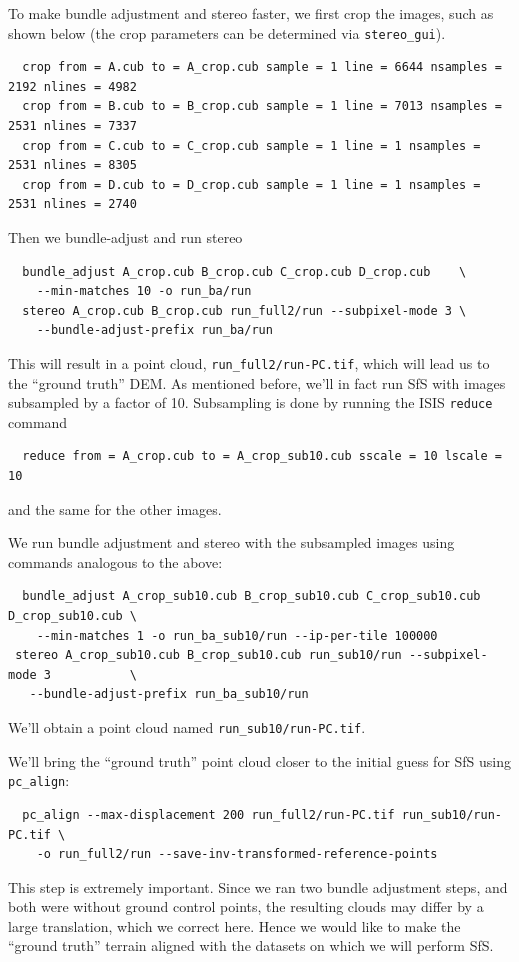 To make bundle adjustment and stereo faster, we first crop the images,
such as shown below (the crop parameters can be determined via
\texttt{stereo\_gui}).
\begin{verbatim}
  crop from = A.cub to = A_crop.cub sample = 1 line = 6644 nsamples = 2192 nlines = 4982
  crop from = B.cub to = B_crop.cub sample = 1 line = 7013 nsamples = 2531 nlines = 7337
  crop from = C.cub to = C_crop.cub sample = 1 line = 1 nsamples = 2531 nlines = 8305
  crop from = D.cub to = D_crop.cub sample = 1 line = 1 nsamples = 2531 nlines = 2740
\end{verbatim}
Then we bundle-adjust and run stereo
\begin{verbatim}
  bundle_adjust A_crop.cub B_crop.cub C_crop.cub D_crop.cub    \
    --min-matches 10 -o run_ba/run
  stereo A_crop.cub B_crop.cub run_full2/run --subpixel-mode 3 \
    --bundle-adjust-prefix run_ba/run
\end{verbatim}

This will result in a point cloud, \verb#run_full2/run-PC.tif#, which will
lead us to the ``ground truth'' DEM. As mentioned
before, we'll in fact run SfS with images subsampled by a factor of
10. Subsampling is done by running the ISIS \texttt{reduce} command
\begin{verbatim}
  reduce from = A_crop.cub to = A_crop_sub10.cub sscale = 10 lscale = 10
\end{verbatim}
and the same for the other images.

We run bundle adjustment and stereo with the subsampled images using
commands analogous to the above:
\begin{verbatim}
  bundle_adjust A_crop_sub10.cub B_crop_sub10.cub C_crop_sub10.cub D_crop_sub10.cub \
    --min-matches 1 -o run_ba_sub10/run --ip-per-tile 100000
 stereo A_crop_sub10.cub B_crop_sub10.cub run_sub10/run --subpixel-mode 3           \
   --bundle-adjust-prefix run_ba_sub10/run
\end{verbatim}
We'll obtain a point cloud named \verb#run_sub10/run-PC.tif#.

We'll bring the ``ground truth'' point cloud closer to the initial guess
for SfS using \texttt{pc\_align}:
\begin{verbatim}
  pc_align --max-displacement 200 run_full2/run-PC.tif run_sub10/run-PC.tif \
    -o run_full2/run --save-inv-transformed-reference-points
\end{verbatim}
This step is extremely important. Since we ran two bundle adjustment
steps, and both were without ground control points, the resulting clouds
may differ by a large translation, which we correct here. Hence we would like to 
make the ``ground truth'' terrain aligned with the datasets on which we 
will perform SfS. 

